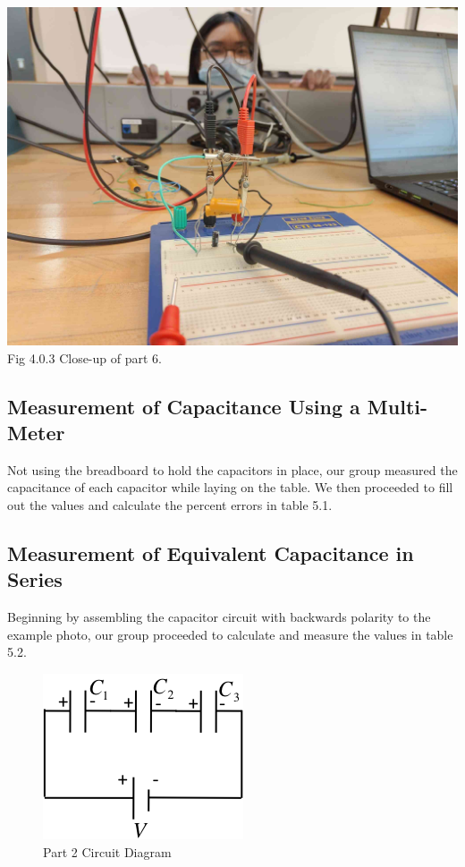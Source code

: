 \documentclass[titlepage]{article}
\begin{document}
\begin{center}
	\includegraphics[scale=0.12]{selfies/part-6.jpg}\\
	Fig 4.0.3 Close-up of part 6.\\
\end{center}
        \subsection{Measurement of Capacitance Using a Multi-Meter}
        Not using the breadboard to hold the capacitors in place, our group measured the capacitance of each capacitor while laying on the table. We then proceeded to fill out the values and calculate the percent errors in table 5.1.

        \subsection{Measurement of Equivalent Capacitance in Series}
        Beginning by assembling the capacitor circuit with backwards polarity to the example photo, our group proceeded to calculate and measure the values in table 5.2.\\ 

        \begin{figure}[hbt!] 
            \centering
            \caption*{Part 2 Circuit Diagram}
            \includegraphics{images/procedure/part2.png}
        \end{figure} 
\end{document}
